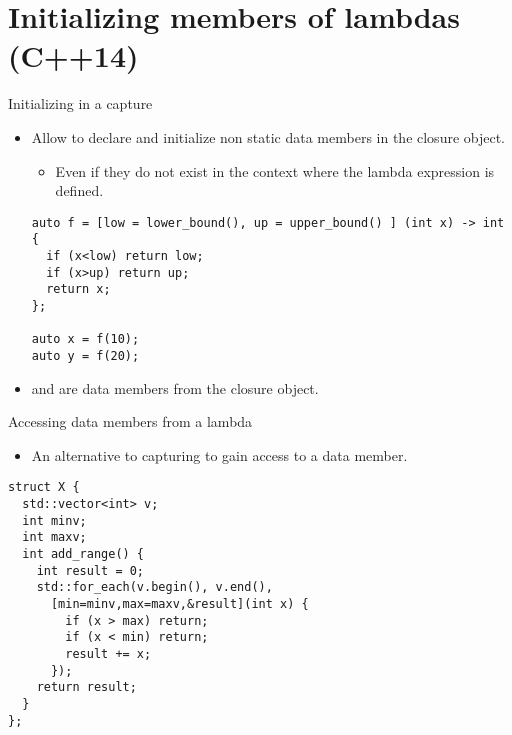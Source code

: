 \section{Initializing members of lambdas (C++14)}

\begin{frame}[fragile]{Initializing in a capture}
\begin{itemize}
  \item Allow to declare and initialize non static data members in the closure object.
    \begin{itemize}
      \item Even if they do not exist in the context where the lambda expression is defined.
    \end{itemize}
\begin{lstlisting}
auto f = [low = lower_bound(), up = upper_bound() ] (int x) -> int {
  if (x<low) return low;
  if (x>up) return up;
  return x;
};

auto x = f(10);
auto y = f(20);
\end{lstlisting}
  \item {} and  
        are data members from the closure object.
\end{itemize}
\end{frame}

\begin{frame}[fragile]{Accessing data members from a lambda}
\begin{itemize}
  \item An alternative to capturing  to gain access to
        a data member.
\end{itemize}
\begin{lstlisting}
struct X {
  std::vector<int> v;
  int minv;
  int maxv;
  int add_range() {
    int result = 0;
    std::for_each(v.begin(), v.end(),
      [min=minv,max=maxv,&result](int x) {
        if (x > max) return;
        if (x < min) return;
        result += x;
      });
    return result;
  }
};
\end{lstlisting}
\end{frame}


